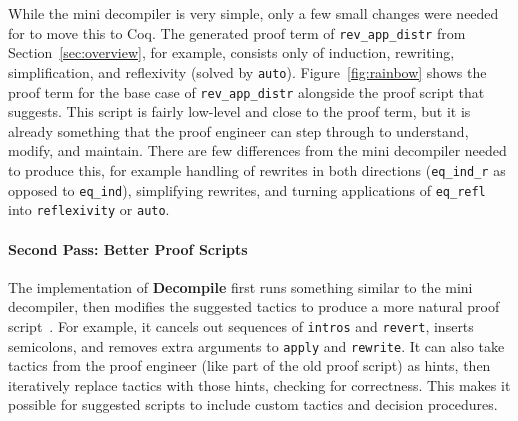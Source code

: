 While the mini decompiler is very simple, only a few small changes were needed for 
to move this to Coq.
The generated proof term of \lstinline{rev_app_distr} from Section~\ref{sec:overview},
for example, consists only of induction, rewriting, simplification, and reflexivity (solved by \lstinline{auto}).
Figure~\ref{fig:rainbow} shows the proof term for the base case of \lstinline{rev_app_distr} 
alongside the proof script that \toolnamec suggests.
This script is fairly low-level and close to the proof term, but it is already something that the proof engineer
can step through to understand, modify, and maintain.
There are few differences from the mini decompiler needed to produce this,
for example handling of rewrites in both directions (\lstinline{eq_ind_r} as opposed to \lstinline{eq_ind}),
simplifying rewrites,
and turning applications of \lstinline{eq_refl} into \lstinline{reflexivity} or \lstinline{auto}.

\paragraph{Second Pass: Better Proof Scripts}
The implementation of \textbf{Decompile} first runs something similar to the mini decompiler, then modifies the suggested tactics to produce a more natural proof script~\href{https://github.com/uwplse/coq-plugin-lib/tree/9ef05815c261de9c99b604c6b581ba1c4fbc1a46/src/coq/decompiler/decompiler.ml}{}. %
For example, it cancels out sequences of \lstinline{intros} and \lstinline{revert},
inserts semicolons, and removes extra arguments to \lstinline{apply} and \lstinline{rewrite}. %
It can also take tactics from the proof engineer (like part of the old proof script) as hints,
then iteratively replace tactics with those hints, checking for correctness.
This makes it possible for suggested scripts to include custom tactics and decision procedures.

